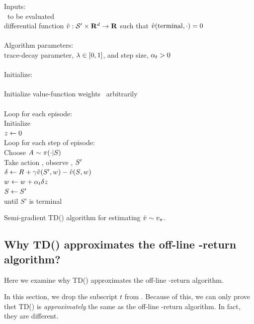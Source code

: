\begin{table}
\beginalg
Inputs:\\
\> \pol\ to be evaluated
\\
\> differential function $\hat{v}: {\mathcal{S}'} \times \mathbf{R}^d \to \mathbf{R}$
	such that $\hat{v}(\mathrm{terminal}, \cdot) = 0$
\\\\
Algorithm parameters:
\\
\> trace-decay parameter, $\lambda \in [0,1]$, and step size, $\alpha_{t}>0$
\\\\
Initialize:
\\\\
\> Initialize value-function weights \wvector{}\ arbitrarily
\\\\
Loop for each episode:\\
\> Initialize \state\
\\
\> $z_{} \leftarrow 0$
\\
\> Loop for each step of episode:
\\
\> \> Choose $A_{} \sim \pi(\cdot|S_{})$\\
\> \> Take action \action, observe \reward{}, $S_{}'$\\
\> \> $\delta_{} \leftarrow R_{} + \gamma \hat{v}(S_{}', {w_{}}) - \hat{v}(S_{}, {w_{}})$\\
\> \> ${w_{}} \leftarrow {w_{}} + \alpha_{t} \delta_{} z_{}$\\
\> \> $S_{} \leftarrow S_{}'$
\\
\> until $S'$ is terminal
\endalg
\caption{Semi-gradient TD(\tdparam) algorithm for estimating $\hat{v} \sim v_{\pi}$.}
\label{tab:alg:et:semi-gradient}
\end{table}


\subsection{Why TD(\tdparam) approximates the off-line \tdparam-return algorithm?}

Here we examine why TD(\tdparam) approximates the off-line \tdparam-return algorithm.

In this section, we drop the subscript $t$ from .
Because of this, we can only prove thet TD(\tdparam) is \emph{approximately} the same as the off-line \tdparam-return algorithm.
In fact, they are different.

